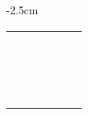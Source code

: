 \begin{center}
\begin{adjustwidth}{-2.5cm}{}
\begin{tabular}{|c c c c c c|}
             &  &  &  &  &  \\
             &  &  &  &  &  \\
             &  &  &  &  &  \\
             &  &  &  &  &  \\
             &  &  &  &  &  \\
             &  &  &  &  &  \\
             &  &  &  &  &  \\
             &  &  &  &  &  \\
             &  &  &  &  &  \\
             &  &  &  &  &  \\
             &  &  &  &  &  \\
             &  &  &  &  &  \\
             &  &  &  &  &  \\
             &  &  &  &  &  \\
             &  &  &  &  &  \\
             &  &  &  &  &  \\
            \hline
        \end{tabular}
    \end{adjustwidth}
\end{center}

